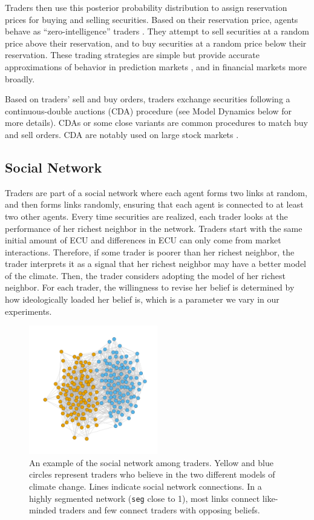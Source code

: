 \documentclass{wscpaperproc}\usepackage[]{graphicx}\usepackage[]{color}
\begin{document}
Traders then use this posterior probability distribution to assign reservation prices for buying and selling securities. 
Based on their reservation price, agents behave as ``zero-intelligence'' traders .
They attempt to sell securities at a random price above their reservation, and to buy securities at a random price below their reservation.
These trading strategies are simple but provide accurate approximations of behavior in prediction markets , and in financial markets more broadly.

Based on traders' sell and buy orders, traders exchange securities following a continuous-double auctions (CDA) procedure (see Model Dynamics below for more details). 
CDAs or some close variants are common procedures to match buy and sell orders. 
CDA are notably used on large stock markets .
 
\subsection{Social Network}

Traders are part of a social network where each agent forms two links at random, and then forms links randomly, ensuring that each agent is connected to at least two other agents. 
Every time securities are realized, each trader looks at the performance of her richest neighbor in the network. 
Traders start with the same initial amount of ECU and differences in ECU can only come from market interactions.
Therefore, if some trader is poorer than her richest neighbor, the trader interprets it as a signal that her richest neighbor may have a better model of the climate.
Then, the trader considers adopting the model of her richest neighbor. 
For each trader, the willingness to revise her belief is determined by how ideologically loaded her belief is, which is a parameter we vary in our experiments.
\begin{figure}[t]
\begin{center}
\includegraphics[width=0.50\textwidth]{output/network.pdf}
\caption{An example of the social network among traders. Yellow and blue circles represent traders who believe in the two different models of climate change. Lines indicate social network connections. In a highly segmented network (\texttt{seg} close to 1), most links connect like-minded traders and few connect traders with opposing beliefs.}\label{fig:social_network}%
\end{center}
\end{figure}
\end{document}
